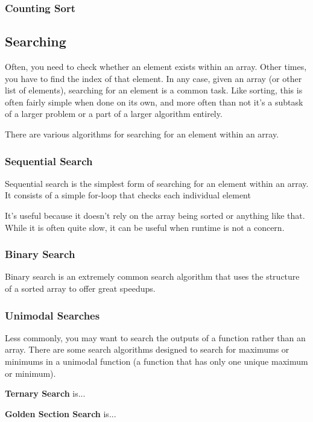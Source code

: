 \subsubsection{Counting Sort}

\subsection{Searching}

Often, you need to check whether an element exists within an array. Other times, you have to find the index of that element. In any case, given an array (or other list of elements), searching for an element is a common task. Like sorting, this is often fairly simple when done on its own, and more often than not it's a subtask of a larger problem or a part of a larger algorithm entirely.

There are various algorithms for searching for an element within an array.

\subsubsection{Sequential Search}

Sequential search is the simplest form of searching for an element within an array. It consists of a simple for-loop that checks each individual element 

It's useful because it doesn't rely on the array being sorted or anything like that. While it is often quite slow, it can be useful when runtime is not a concern.

\subsubsection{Binary Search}

Binary search is an extremely common search algorithm that uses the structure of a sorted array to offer great speedups.

\subsubsection{Unimodal Searches}

Less commonly, you may want to search the outputs of a function rather than an array. There are some search algorithms designed to search for maximums or minimums in a unimodal function (a function that has only one unique maximum or minimum).

\textbf{Ternary Search} is...

\textbf{Golden Section Search} is...